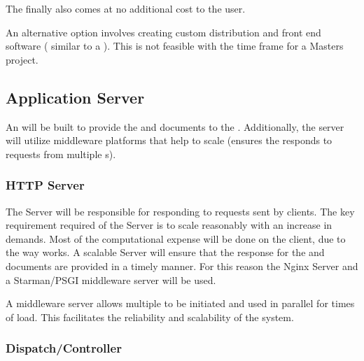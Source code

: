 \documentclass[11pt]{report}
\begin{document}
The  finally also comes at no additional cost to the user.  

An alternative option involves creating custom distribution and front end software ( similar to a  ). This is not feasible with the time frame for a Masters project.  

\subsection{Application Server}


An  will be built to provide the  and  documents to the . Additionally, the server will utilize middleware platforms that help to scale (ensures the  responds to requests from multiple s).

\subsubsection{HTTP Server}


The  Server will be responsible for responding to requests sent by  clients. The key requirement required of the  Server is to scale reasonably with an increase in demands. Most of the computational expense will be done on the  client, due to the way  works. A scalable  Server will ensure that the response for the  and  documents are provided in a timely manner. For this reason the Nginx  Server and a Starman/PSGI middleware server will be used.

A middleware server allows multiple  to be initiated and used in parallel for times of load. This facilitates the reliability and scalability of the system. 

\subsubsection{Dispatch/Controller}

\end{document}
